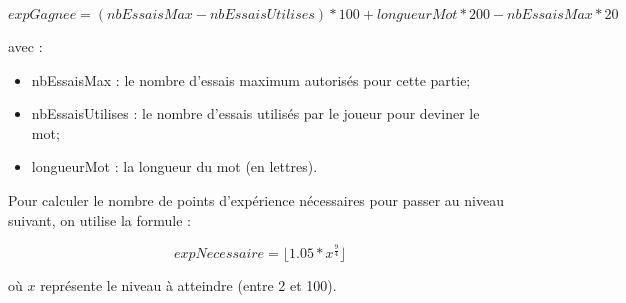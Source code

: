 \begin{equation}
    expGagnee = (nbEssaisMax - nbEssaisUtilises) * 100 + longueurMot * 200 - nbEssaisMax * 20
\end{equation}

\tabto{0cm}avec :
\begin{itemize}
    \item nbEssaisMax : le nombre d'essais maximum autorisés pour cette partie;
    \item nbEssaisUtilises : le nombre d'essais utilisés par le joueur pour deviner le mot;
    \item longueurMot : la longueur du mot (en lettres).
\end{itemize}

\tabto{0cm}Pour calculer le nombre de points d'expérience nécessaires pour passer au niveau suivant, on utilise la formule :

\begin{equation}
    expNecessaire = \lfloor 1.05 * x^\frac{9}{4} \rfloor
\end{equation}

\tabto{0cm}où $x$ représente le niveau à atteindre (entre 2 et 100).


